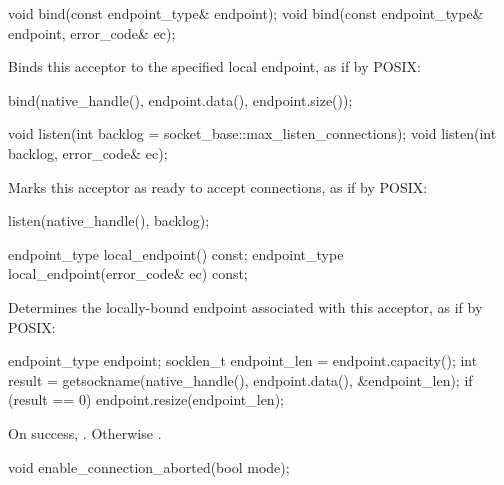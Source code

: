 \begin{itemdecl}
void bind(const endpoint_type& endpoint);
void bind(const endpoint_type& endpoint, error_code& ec);
\end{itemdecl}

\begin{itemdescr}
\pnum
\effects Binds this acceptor to the specified local endpoint, as if by POSIX:
\begin{codeblock}
bind(native_handle(), endpoint.data(), endpoint.size());
\end{codeblock}
\end{itemdescr}

\begin{itemdecl}
void listen(int backlog = socket_base::max_listen_connections);
void listen(int backlog, error_code& ec);
\end{itemdecl}

\begin{itemdescr}
\pnum
\effects Marks this acceptor as ready to accept connections, as if by POSIX:
\begin{codeblock}
listen(native_handle(), backlog);
\end{codeblock}
\end{itemdescr}

\begin{itemdecl}
endpoint_type local_endpoint() const;
endpoint_type local_endpoint(error_code& ec) const;
\end{itemdecl}

\begin{itemdescr}
\pnum
\effects Determines the locally-bound endpoint associated with this acceptor, as if by POSIX:
\begin{codeblock}
endpoint_type endpoint;
socklen_t endpoint_len = endpoint.capacity();
int result = getsockname(native_handle(), endpoint.data(), &endpoint_len);
if (result == 0)
  endpoint.resize(endpoint_len);
\end{codeblock}


\pnum
\returns On success, . Otherwise .
\end{itemdescr}

\begin{itemdecl}
void enable_connection_aborted(bool mode);
\end{itemdecl}

